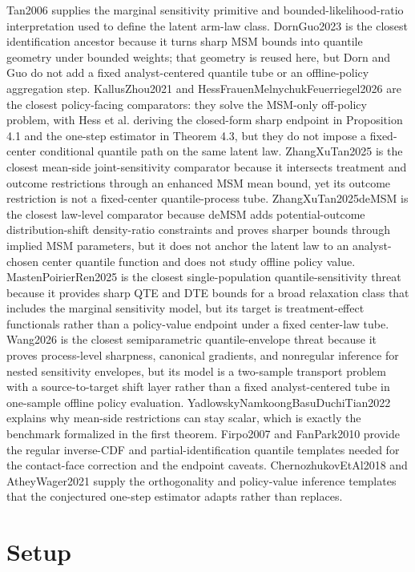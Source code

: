 \documentclass{article}
\begin{document}
Tan2006 supplies the marginal sensitivity primitive and bounded-likelihood-ratio interpretation used to define the latent arm-law class. DornGuo2023 is the closest identification ancestor because it turns sharp MSM bounds into quantile geometry under bounded weights; that geometry is reused here, but Dorn and Guo do not add a fixed analyst-centered quantile tube or an offline-policy aggregation step. KallusZhou2021 and HessFrauenMelnychukFeuerriegel2026 are the closest policy-facing comparators: they solve the MSM-only off-policy problem, with Hess et al. deriving the closed-form sharp endpoint in Proposition 4.1 and the one-step estimator in Theorem 4.3, but they do not impose a fixed-center conditional quantile path on the same latent law. ZhangXuTan2025 is the closest mean-side joint-sensitivity comparator because it intersects treatment and outcome restrictions through an enhanced MSM mean bound, yet its outcome restriction is not a fixed-center quantile-process tube. ZhangXuTan2025deMSM is the closest law-level comparator because deMSM adds potential-outcome distribution-shift density-ratio constraints and proves sharper bounds through implied MSM parameters, but it does not anchor the latent law to an analyst-chosen center quantile function and does not study offline policy value. MastenPoirierRen2025 is the closest single-population quantile-sensitivity threat because it provides sharp QTE and DTE bounds for a broad relaxation class that includes the marginal sensitivity model, but its target is treatment-effect functionals rather than a policy-value endpoint under a fixed center-law tube. Wang2026 is the closest semiparametric quantile-envelope threat because it proves process-level sharpness, canonical gradients, and nonregular inference for nested sensitivity envelopes, but its model is a two-sample transport problem with a source-to-target shift layer rather than a fixed analyst-centered tube in one-sample offline policy evaluation. YadlowskyNamkoongBasuDuchiTian2022 explains why mean-side restrictions can stay scalar, which is exactly the benchmark formalized in the first theorem. Firpo2007 and FanPark2010 provide the regular inverse-CDF and partial-identification quantile templates needed for the contact-face correction and the endpoint caveats. ChernozhukovEtAl2018 and AtheyWager2021 supply the orthogonality and policy-value inference templates that the conjectured one-step estimator adapts rather than replaces.

\section{Setup}
\end{document}
